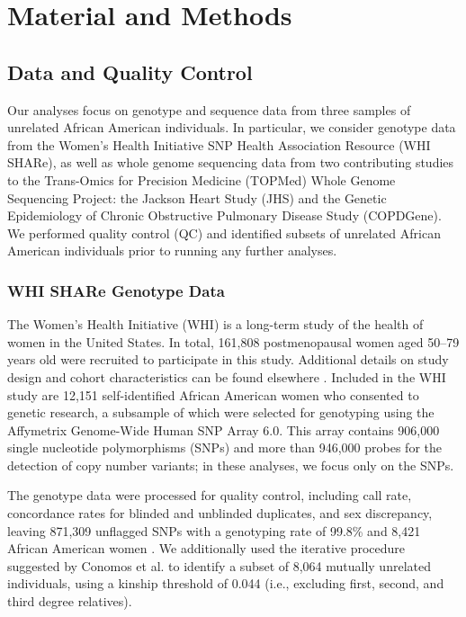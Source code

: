 \documentclass[12pt]{article}
\begin{document}
\section{Material and Methods}


\subsection{Data and Quality Control}

Our analyses focus on genotype and sequence data from three samples of unrelated African American individuals.
In particular, we consider genotype data from the Women's Health Initiative SNP Health Association Resource (WHI SHARe), as well as whole genome sequencing data from two contributing studies to the Trans-Omics for Precision Medicine (TOPMed) Whole Genome Sequencing Project: the Jackson Heart Study (JHS) and the Genetic Epidemiology of Chronic Obstructive Pulmonary Disease Study (COPDGene).
We performed quality control (QC) and identified subsets of unrelated African American individuals prior to running any further analyses.

\subsubsection{WHI SHARe Genotype Data}

The Women's Health Initiative (WHI) is a long-term study of the health of women in the United States.
In total, 161,808 postmenopausal women aged 50--79 years old were recruited to participate in this study.
Additional details on study design and cohort characteristics can be found elsewhere \cite{whi}.
Included in the WHI study are 12,151 self-identified African American women who consented to genetic research, a subsample of which were selected for genotyping using the Affymetrix Genome-Wide Human SNP Array 6.0.
This array contains 906,000 single nucleotide polymorphisms (SNPs) and more than 946,000 probes for the detection of copy number variants; in these analyses, we focus only on the SNPs.

The genotype data were processed for quality control, including call rate, concordance rates for blinded and unblinded duplicates, and sex discrepancy, leaving 871,309 unflagged SNPs with a genotyping rate of 99.8\% and 8,421 African American women \cite{reiner2012}.
We additionally used the iterative procedure suggested by Conomos et al. \cite{conomos2016related} to identify a subset of 8,064 mutually unrelated individuals, using a kinship threshold of 0.044 (i.e., excluding first, second, and third degree relatives).
\end{document}
